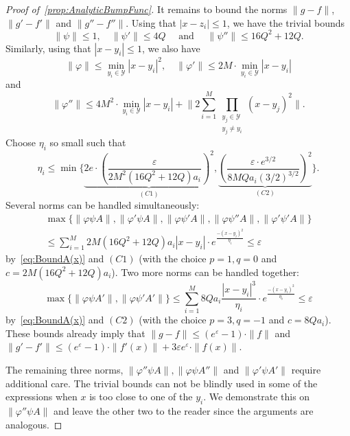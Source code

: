 \documentclass[12pt,]{article}
\def\cref#1{\ref{#1}}%
\theoremstyle{definition}
\theoremstyle{remark}
\newcommand{\0}{\mathbf{0}}
\begin{document}
{\begin{proof}[Proof of~\cref{prop:AnalyticBumpFunc}]
It remains to bound the norms $\|g-f\|$, $\|g'-f'\|$ and $\|g''-f''\|$. Using that $|x-z_i|\leq 1$,
we have the trivial bounds
\begin{equation*}
\|\psi\| \leq 1, \quad \|\psi'\| \leq 4Q \quad\text{ and }\quad  \|\psi''\| \leq 16Q^2+12Q.
\end{equation*}
Similarly, using that $|x-y_i|\leq 1$, we also have
\begin{equation*}
\|\varphi\| \leq \min_{y_i\in\mathcal{Y}} |x-y_i|^2, \quad \|\varphi'\| \leq
2M\cdot\min_{y_i\in\mathcal{Y}} |x-y_i|  
\end{equation*} 
and
\begin{equation*}
\|\varphi''\| \leq 4M^2\cdot \min_{y_i\in\mathcal{Y}} |x-y_i| + \bigg\|2\sum_{i=1}^{M}
\prod_{\substack{y_j\in\mathcal{Y}\\ y_j\neq y_i}} (x-y_j)^2\bigg\|.
\end{equation*}
Choose $\eta_i$ so small such that
\begin{equation*}
\eta_i \leq \min \bigg\{ \underbrace{2e\cdot \left(\frac{\varepsilon}{2M^2(16Q^2+12Q)a_i}\right)^2
}_{(C1)}, \underbrace{ \left(\frac{\varepsilon\cdot
e^{3/2}}{8MQa_i(3/2)^{3/2}}\right)^2}_{(C2)}\bigg\}.
\end{equation*}
Several norms can be handled simultaneously:
\begin{multline*}
\max\{ \|\varphi \psi A\|,\|\varphi' \psi A\|, \|\varphi \psi' A\|, \|\varphi \psi'' A\|, \|\varphi' \psi' A\| \} \\
\leq \sum_{i=1}^M 2M(16Q^2+12Q)a_i |x-y_i| \cdot e^{\frac{-(x-y_i)^2}{\eta_i}} \leq \varepsilon
\end{multline*}
by~\cref{eq:BoundA(x)} and $(C1)$ (with the choice $p=1, q=0$ and $c=2M(16Q^2+12Q)a_i$). Two more
norms can be handled together:
\begin{equation*}
\max\{ \|\varphi \psi A'\|, \|\varphi \psi' A'\| \}
	\leq \sum_{i=1}^M 8Qa_i \frac{|x-y_i|^3}{\eta_i} \cdot e^{\frac{-(x-y_i)^2}{\eta_i}} \leq \varepsilon
\end{equation*}
by~\cref{eq:BoundA(x)} and $(C2)$ (with the choice $p=3, q=-1$ and $c=8Qa_i$). These bounds already
imply that $\|g-f\|\leq (e^{\varepsilon}-1)\cdot \|f\|$ and $\|g'-f'\|\leq
(e^{\varepsilon}-1)\cdot\|f'(x)\|+3\varepsilon e^{\varepsilon} \cdot\|f(x)\|$.

The remaining three norms, $\|\varphi'' \psi A\|,\|\varphi \psi A''\|$ and $\|\varphi' \psi A'\|$
require additional care. The trivial bounds can not be blindly used in some of the expressions when
$x$ is too close to one of the $y_i$. We demonstrate this on $\|\varphi'' \psi A\|$ and leave the
other two to the reader since the arguments are analogous.


\end{proof}}
\end{document}
